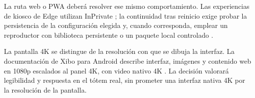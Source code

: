 La ruta web o PWA deberá resolver ese mismo comportamiento. Las experiencias de kiosco de Edge utilizan InPrivate \cite{edge}; la continuidad tras reinicio exige probar la persistencia de la configuración elegida y, cuando corresponda, emplear un reproductor con biblioteca persistente o un paquete local controlado \cite{pwa,xibostorage}.

La pantalla 4K se distingue de la resolución con que se dibuja la interfaz. La documentación de Xibo para Android describe interfaz, imágenes y contenido web en 1080p escalados al panel 4K, con video nativo 4K \cite{xiboresolution}. La decisión valorará legibilidad y respuesta en el tótem real, sin prometer una interfaz nativa 4K por la resolución de la pantalla.

